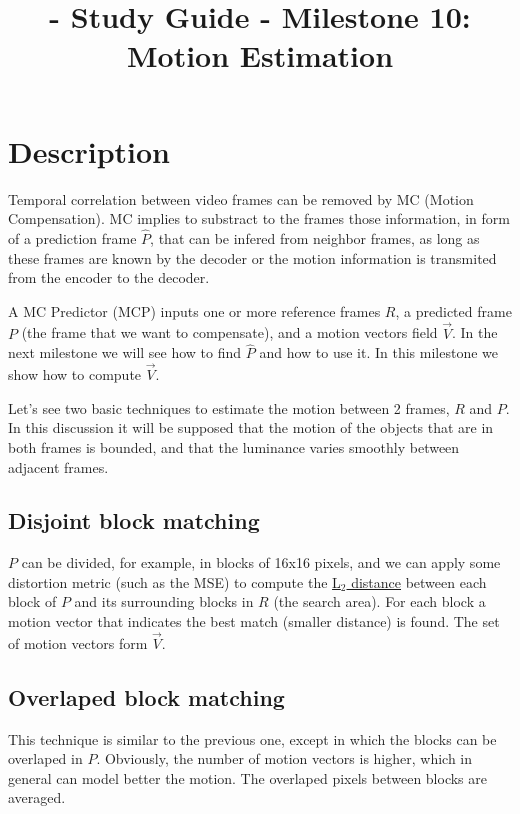 
\title{\SM{} - Study Guide - Milestone 10: Motion Estimation}

\maketitle

\section{Description}

Temporal correlation between video frames can be removed by MC (Motion
Compensation). MC implies to substract to the frames those
information, in form of a prediction frame $\hat{P}$, that can be
infered from neighbor frames, as long as these frames are known by the
decoder or the motion information is transmited from the encoder to
the decoder.

A MC Predictor (MCP) inputs one or more reference frames $R$, a
predicted frame $P$ (the frame that we want to compensate), and a
motion vectors field $\overset{\rightarrow}{V}$. In the next milestone
we will see how to find $\hat{P}$ and how to use it. In this milestone
we show how to compute $\overset{\rightarrow}{V}$.

Let's see two basic techniques to estimate the motion between 2
frames, $R$ and $P$. In this discussion it will be supposed that the
motion of the objects that are in both frames is bounded, and that the
luminance varies smoothly between adjacent frames.

\subsection{Disjoint block matching}
$P$ can be divided, for example, in blocks of 16x16 pixels, and we can
apply some distortion metric (such as the MSE) to compute the
\href{https://en.wikipedia.org/wiki/Euclidean_distance}{L$_2$
  distance} between each block of $P$ and its surrounding blocks in
$R$ (the search area). For each block a motion vector that indicates
the best match (smaller distance) is found. The set of motion vectors
form $\overset{\rightarrow}{V}$.

\subsection{Overlaped block matching}
This technique is similar to the previous one, except in which the
blocks can be overlaped in $P$. Obviously, the number of motion
vectors is higher, which in general can model better the motion. The
overlaped pixels between blocks are averaged.


